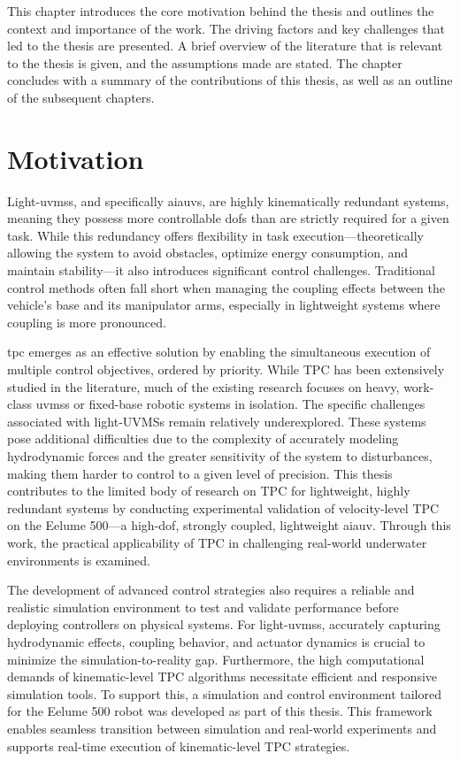 \label{ch:introduction}
This chapter introduces the core motivation behind the thesis and outlines the
context and importance of the work. The driving factors and key challenges that
led to the thesis are presented. A brief overview of the literature that is
relevant to the thesis is given, and the assumptions made are
stated. The chapter concludes with a summary of the contributions of this thesis,
as well as an outline of the subsequent chapters.

\section{Motivation}
\label{sec:introduction:motivation}


Light-\glspl{uvms}, and specifically \glspl{aiauv}, are highly kinematically redundant systems, meaning they possess more controllable \glspl{dof} than are strictly required for a given task. While this redundancy offers flexibility in task execution—theoretically allowing the system to avoid obstacles, optimize energy consumption, and maintain stability—it also introduces significant control challenges. Traditional control methods often fall short when managing the coupling effects between the vehicle's base and its manipulator arms, especially in lightweight systems where coupling is more pronounced.

\Gls{tpc} emerges as an effective solution by enabling the simultaneous execution of multiple control objectives, ordered by priority. While TPC has been extensively studied in the literature, much of the existing research focuses on heavy, work-class \glspl{uvms} or fixed-base robotic systems in isolation. The specific challenges associated with light-UVMSs remain relatively underexplored. These systems pose additional difficulties due to the complexity of accurately modeling hydrodynamic forces and the greater sensitivity of the system to disturbances, making them harder to control to a given level of precision.
This thesis contributes to the limited body of research on TPC for lightweight, highly redundant systems by conducting experimental validation of velocity-level TPC on the Eelume 500—a high-\gls{dof}, strongly coupled, lightweight \gls{aiauv}. Through this work, the practical applicability of TPC in challenging real-world underwater environments is examined.

The development of advanced control strategies also requires a reliable and realistic simulation environment to test and validate performance before deploying controllers on physical systems. For light-\gls{uvms}s, accurately capturing hydrodynamic effects, coupling behavior, and actuator dynamics is crucial to minimize the simulation-to-reality gap. Furthermore, the high computational demands of kinematic-level TPC algorithms necessitate efficient and responsive simulation tools.
To support this, a simulation and control environment tailored for the Eelume 500 robot was developed as part of this thesis. This framework enables seamless transition between simulation and real-world experiments and supports real-time execution of kinematic-level TPC strategies.

